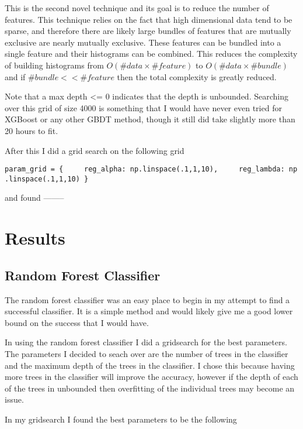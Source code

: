 \documentclass[11pt]{article}
\begin{document}
This is the second novel technique and its goal is to reduce the number
of features. This technique relies on the fact that high dimensional
data tend to be sparse, and therefore there are likely large bundles of
features that are mutually exclusive are nearly mutually exclusive.
These features can be bundled into a single feature and their histograms
can be combined. This reduces the complexity of building histograms from
\(O(\#data \times \#feature)\) to \(O(\#data \times \#bundle)\) and if
\(\#bundle << \#feature\) then the total complexity is greatly reduced.

    Note that a max depth \textless{}= 0 indicates that the depth is
unbounded. Searching over this grid of size 4000 is something that I
would have never even tried for XGBoost or any other GBDT method, though
it still did take slightly more than 20 hours to fit.

After this I did a grid search on the following grid

\texttt{param\_grid\ =\ \{\ \ \ \ \ \textquotesingle{}reg\_alpha\textquotesingle{}:\ np.linspace(.1,1,10),\ \ \ \ \ \textquotesingle{}reg\_lambda\textquotesingle{}:\ np.linspace(.1,1,10)\ \}}

and found --------

    \hypertarget{results}{%
\section{Results}\label{results}}

\hypertarget{random-forest-classifier}{%
\subsection{Random Forest Classifier}\label{random-forest-classifier}}

The random forest classifier was an easy place to begin in my attempt to
find a successful classifier. It is a simple method and would likely
give me a good lower bound on the success that I would have.

In using the random forest classifier I did a gridsearch for the best
parameters. The parameters I decided to seach over are the number of
trees in the classifier and the maximum depth of the trees in the
classifier. I chose this because having more trees in the classifier
will improve the accuracy, however if the depth of each of the trees in
unbounded then overfitting of the individual trees may become an issue.

In my gridsearch I found the best parameters to be the following
\end{document}
